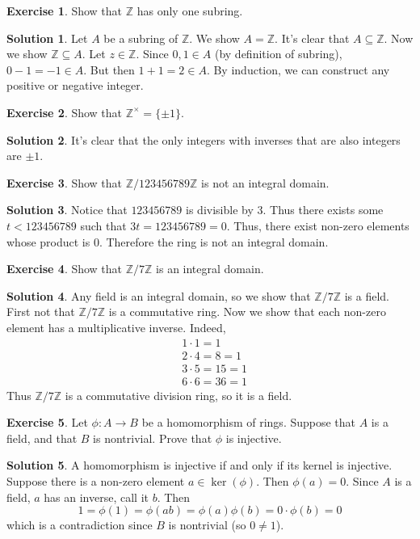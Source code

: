 \documentclass[12pt]{article}
\theoremstyle{definition}
\newcommand{\Z}{\mathbb{Z}}
\newtheorem{exercise}{\color{YellowOrange}Exercise}
\theoremstyle{definition}
\newtheorem{solution}{\color{Goldenrod}Solution}
\begin{document}
\begin{exercise}
	Show that $\Z$ has only one subring.
\end{exercise}
\begin{solution}
	Let $A$ be a subring of $\Z$. We show $A = \Z$. It's clear that $A \subseteq \Z$. Now we show $\Z \subseteq A$. Let $z \in \Z$. Since $0,1 \in A$ (by definition of subring), $0-1 = -1 \in A$. But then $1 + 1 = 2\in A$. By induction, we can construct any positive or negative integer. 
\end{solution}

\begin{exercise}
	Show that $\Z^{\times} = \{\pm 1\}$. 
\end{exercise}
\begin{solution}
	It's clear that the only integers with inverses that are also integers are $\pm 1$. 
\end{solution}

\begin{exercise}
	Show that $\Z / 123456789 \Z$ is not an integral domain. 
\end{exercise}
\begin{solution}
	Notice that $123456789 $ is divisible by 3. Thus there exists some $t < 123456789$ such that $3t = 123456789 = 0$. Thus, there exist non-zero elements whose product is 0. Therefore the ring is not an integral domain. 
\end{solution}

\begin{exercise}
	Show that $\Z / 7\Z$ is an integral domain.
\end{exercise}	
\begin{solution}
	Any field is an integral domain, so we show that $\Z / 7\Z$ is a field. First not that $\Z / 7\Z$ is a commutative ring. Now we show that each non-zero element has a multiplicative inverse. Indeed,
	\begin{align*}
		&1 \cdot 1 = 1 \\
		&2 \cdot 4 = 8 = 1 \\
		&3 \cdot 5 = 15 = 1 \\
		&6 \cdot 6 = 36 = 1
	\end{align*}
	Thus $\Z / 7\Z$ is a commutative division ring, so it is a field. 
\end{solution}

\begin{exercise}
	Let $\phi : A \to B$ be a homomorphism of rings. Suppose that $A$ is a field, and that $B$ is nontrivial. Prove that $\phi$ is injective. 
\end{exercise}
\begin{solution}
	A homomorphism is injective if and only if its kernel is injective. Suppose there is a non-zero element $a \in \ker(\phi)$. Then $\phi(a) = 0$. Since $A$ is a field, $a$ has an inverse, call it $b$. Then
	\begin{equation}
		1 = \phi(1) = \phi(ab) = \phi(a)\phi(b) = 0 \cdot \phi(b) = 0
	\end{equation}
	which is a contradiction since $B$ is nontrivial (so $0 \neq 1$). 
\end{solution} 
\end{document}
